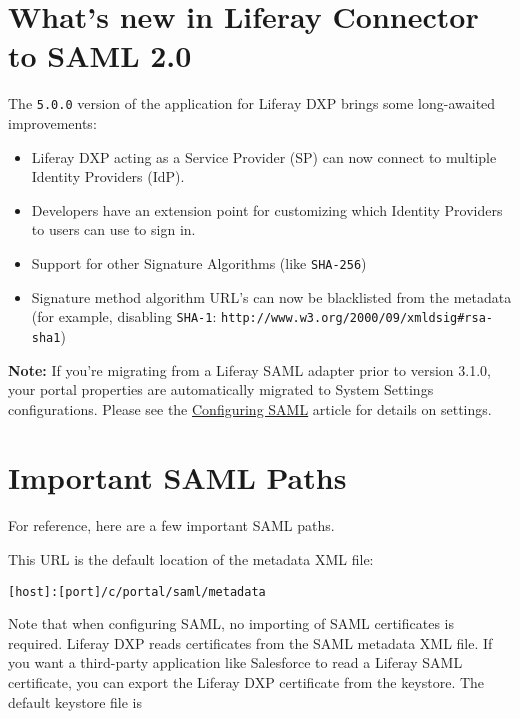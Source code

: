 \section{What's new in Liferay Connector to SAML
2.0}\label{whats-new-in-liferay-connector-to-saml-2.0}

The \texttt{5.0.0} version of the application for Liferay DXP brings
some long-awaited improvements:

\begin{itemize}
\tightlist
\item
  Liferay DXP acting as a Service Provider (SP) can now connect to
  multiple Identity Providers (IdP).
\item
  Developers have an extension point for customizing which Identity
  Providers to users can use to sign in.
\item
  Support for other Signature Algorithms (like \texttt{SHA-256})
\item
  Signature method algorithm URL's can now be blacklisted from the
  metadata (for example, disabling \texttt{SHA-1}:
  \texttt{http://www.w3.org/2000/09/xmldsig\#rsa-sha1})
\end{itemize}

\noindent\hrulefill

\textbf{Note:} If you're migrating from a Liferay SAML adapter prior to
version 3.1.0, your portal properties are automatically migrated to
System Settings configurations. Please see the
\href{/docs/7-2/deploy/-/knowledge_base/d/configuring-saml}{Configuring
SAML} article for details on settings.

\noindent\hrulefill

\section{Important SAML Paths}\label{important-saml-paths}

For reference, here are a few important SAML paths.

This URL is the default location of the metadata XML file:

\begin{verbatim}
[host]:[port]/c/portal/saml/metadata
\end{verbatim}

Note that when configuring SAML, no importing of SAML certificates is
required. Liferay DXP reads certificates from the SAML metadata XML
file. If you want a third-party application like Salesforce to read a
Liferay SAML certificate, you can export the Liferay DXP certificate
from the keystore. The default keystore file is

